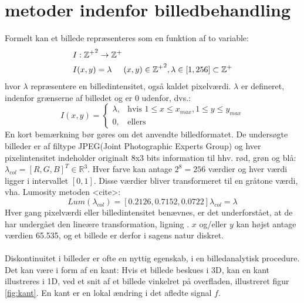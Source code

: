 \section{metoder indenfor billedbehandling}\label{subsec:kant}
Formelt kan et billede repræsenteres som en funktion af to variable:
\begin{equation}
\begin{split}
&I: \mathbb{\mathbb{Z^+}}^2 \rightarrow \mathbb{Z^+} \\
&I(x,y) = \lambda \hspace{0.5 cm} (x,y)\in \mathbb{Z^+}^2, \lambda \in [1,256] \subset \mathbb{Z^+}
\end{split}
\label{bf}
\end{equation}
hvor $\lambda$ repræsentere en billedintensitet, også kaldet pixelværdi. $\lambda$ er defineret, indenfor grænserne af billedet og er 0 udenfor, dvs.: 
\begin{equation}
 I(x, y) =
\begin{cases}
    \lambda, & \text{hvis } 1 \leq x \leq x_{max}, 1 \leq y \leq y_{max} \\
    0,              & \text{ellers}
    \label{pixelintensitet}
\end{cases}
\end{equation}
En kort bemærkning bør gøres om det anvendte billedformatet. De undersøgte billeder er af filtype JPEG(Joint Photographic Experts Group) og hver pixelintensitet indeholder originalt 8x3 bits information til hhv. rød, grøn og blå: $\lambda_{col} = [R,G,B]^T \in \mathbb{R}^3$. Hver farve kan antage $2^8 = 256$ værdier og hver værdi ligger i intervallet $[0,1]$. Disse værdier bliver transformeret til en gråtone værdi, vha. Lumosity metoden <cite>:
\begin{equation}
Lum(\lambda_{col}) = [0.2126, 0.7152, 0.0722] \lambda_{col} = \lambda
\label{lumosity}
\end{equation}
Hver gang pixelværdi eller billedintensitet benævnes, er det underforstået, at de har undergået den lineære transformation, ligning \cite{lumosity}. $x$ og/eller $y$ kan højst antage værdien 65.535, og et billede er derfor i sagens natur diskret.
\\
\\
Diskontinuitet i billeder er ofte en nyttig egenskab, i en billedanalytisk procedure. Det kan være i form af en kant: Hvis et billede beskues i 3D, kan en kant illustreres i 1D, ved et snit af et billede vinkelret på overfladen, illustreret figur \ref{fig:kant}. En kant er en lokal ændring i det afledte signal $f$.
